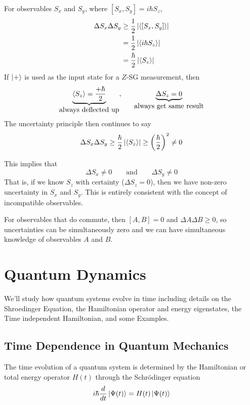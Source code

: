 \documentclass[english, 11pt]{article}
\begin{document}
      \begin{exmp}
        For observables $S_x$ and $S_y$, where $[S_x,S_y] = i\hbar S_z$,
        \begin{align*}
          \Delta S_x \Delta S_y & \geq \frac{1}{2} \left| \langle [S_x,S_y] \rangle \right| \\
                                & = \frac{1}{2} \left| \langle i\hbar S_z \rangle \right| \\
                                & = \frac{\hbar}{2} \left| \langle S_z \rangle \right| \\
        \end{align*}
        If $\left|+\right\rangle$ is used as the input state for a $Z$-SG measurement, then
        \[ \underbrace{\E{S_z} = \f{+\hbar}{2}}_{\mbox{always deflected up}}, \ \ \ \ \ \underbrace{\Delta S_z = 0}_{\mbox{always get same result}} \]
        The uncertainty principle then continues to say
        \[  \Delta S_x \Delta S_y \geq \frac{\hbar}{2} \left| \langle S_z \rangle \right| \geq \left( \frac{\hbar}{2} \right)^2 \not = 0 \]

        This implies that
        \[ \Delta S_x \not = 0 \ \ \ \ \ \ \ \ \ \mbox{and} \ \ \ \ \ \ \ \ \ \Delta S_y \not = 0 \]
        That is, if we know $S_z$ with certainty ($\Delta S_z = 0$), then we have non-zero uncertainty in $S_x$ and $S_y$. This is entirely consistent with the concept of incompatible observables. \newline

        For observables that do commute, then $[A,B] = 0$ and $\Delta A \Delta B \geq 0$, so uncertainties can be simultaneously zero and we can have simultaneous knowledge of observables $A$ and $B$.

      \end{exmp}

  \section{Quantum Dynamics}

    We'll study how quantum systems evolve in time including details on the Shroedinger Equation, the Hamiltonian operator and energy eigenstates, the Time independent Hamiltonian, and some Examples.

    \subsection{Time Dependence in Quantum Mechanics}

    \begin{defn}[Postulate 5]\label{postulate_5}
      The time evolution of a quantum system is determined by the Hamiltonian or total energy operator $H(t)$ through the Schrödinger equation
      \[ i\hbar\frac{d}{dt} \left|\Psi(t)\right\rangle = H(t)\left|\Psi(t)\right\rangle \]
    \end{defn}
\end{document}
